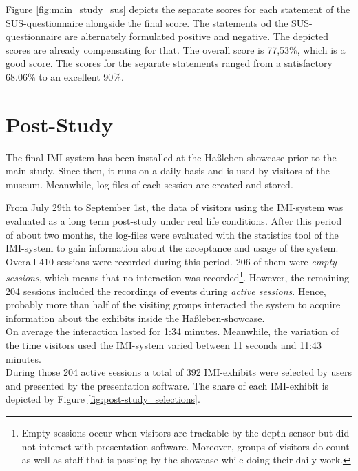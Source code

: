Figure \ref{fig:main_study_sus} depicts the separate scores for each statement of the \ac{SUS}-questionnaire alongside the final score. The statements od the \ac{SUS}-questionnaire are alternately formulated positive and negative. The depicted scores are already compensating for that. The overall score is 77,53$\%$, which is a good score. The scores for the separate statements ranged from a satisfactory 68.06$\%$ to an excellent 90$\%$.


\section{Post-Study}
\label{evaluation_post}

The final \ac{IMI}-system has been installed at the Haßleben-showcase prior to the main study. Since then, it runs on a daily basis and is used by visitors of the museum. Meanwhile, log-files of each session are created and stored.

From July 29th to September 1st, the data of visitors using the \ac{IMI}-system was evaluated as a long term post-study under real life conditions. After this period of about two months, the log-files were evaluated with the statistics tool of the \ac{IMI}-system to gain information about the acceptance and usage of the system.
\\
Overall 410 sessions were recorded during this period. 206 of them were \textit{empty sessions}, which means that no interaction was recorded\footnote{Empty sessions occur when visitors are trackable by the depth sensor but did not interact with presentation software. Moreover, groups of visitors do count as well as staff that is passing by the showcase while doing their daily work.}. However, the remaining 204 sessions included the recordings of events during \textit{active sessions}. Hence, probably more than half of the visiting groups interacted the system to acquire information about the exhibits inside the Haßleben-showcase.
\\
On average the interaction lasted for 1:34 minutes. Meanwhile, the variation of the time visitors used the \ac{IMI}-system varied between 11 seconds and 11:43 minutes.
\\
During those 204 active sessions a total of 392 \ac{IMI}-exhibits were selected by users and presented by the presentation software. The share of each \ac{IMI}-exhibit is depicted by Figure \ref{fig:post-study_selections}. 

